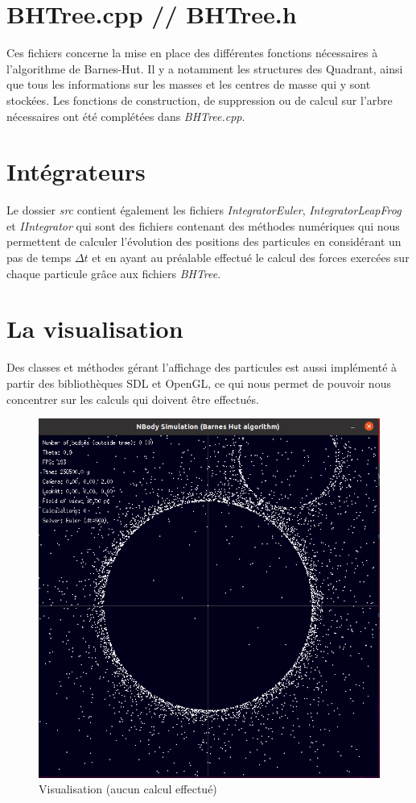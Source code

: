 \section{BHTree.cpp // BHTree.h}
Ces fichiers concerne la mise en place des différentes fonctions nécessaires à l'algorithme de Barnes-Hut. Il y a notamment les structures des Quadrant, ainsi que tous les informations sur les masses et les centres de masse qui y sont stockées. Les fonctions de construction, de suppression ou de calcul sur l'arbre nécessaires ont été complétées dans \textit{BHTree.cpp}.

\section{Intégrateurs}
Le dossier \textit{src} contient également les fichiers \textit{IntegratorEuler}, \textit{IntegratorLeapFrog} et \textit{IIntegrator} qui sont des fichiers contenant des méthodes numériques qui nous permettent de calculer l'évolution des positions des particules en considérant un pas de temps \textit{$\Delta t$} et en ayant au préalable effectué le calcul des forces exercées sur chaque particule grâce aux fichiers \textit{BHTree}.

\section{La visualisation}
Des classes et méthodes gérant l'affichage des particules est aussi implémenté à partir des bibliothèques SDL et OpenGL, ce qui nous permet de pouvoir nous concentrer sur les calculs qui doivent être effectués.

\begin{figure}[!h]
\begin{center}
\includegraphics[width=13cm]{aff.png}
\end{center}
\caption{Visualisation (aucun calcul effectué)}
\end{figure}
 
